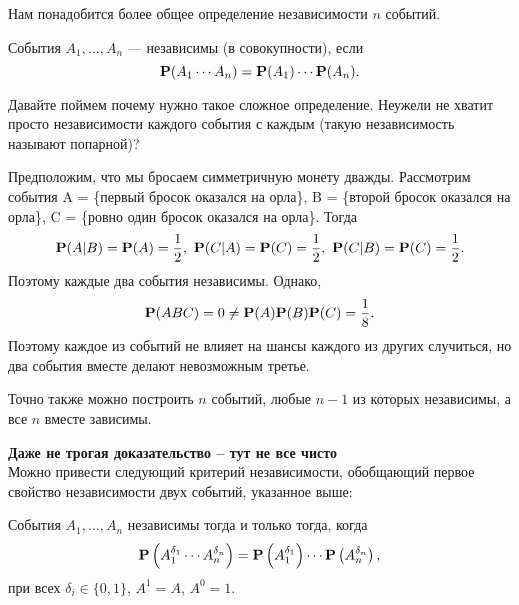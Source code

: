 \documentclass[11 pt,russian]{article}
\begin{document}
Нам понадобится более общее определение независимости $n$ событий.
\begin{Def}
События $A_1,\dotsc,A_n$ --- независимы (в совокупности), если
$${\bf P}(A_1 \dotsm A_n) = {\bf P}(A_1) \dotsm {\bf P}(A_n).
$$
\end{Def}
Давайте поймем почему нужно такое сложное определение. Неужели не хватит просто независимости каждого события с каждым (такую независимость называют попарной)?
\begin{Exam}
Предположим, что мы бросаем симметричную монету дважды. Рассмотрим события A = \{первый бросок оказался на орла\}, B = \{второй бросок оказался на орла\}, C = \{ровно один бросок оказался на орла\}. Тогда 
$$
{\bf P}(A|B) = {\bf P}(A) = \frac12,\ 
{\bf P}(C|A) = {\bf P}(C) = \frac12,\
{\bf P}(C|B) = {\bf P}(C) = \frac12.
$$
Поэтому каждые два события независимы. Однако,
$$
{\bf P}(ABC) = 0 \neq {\bf P}(A) {\bf P}(B) {\bf P}(C) = \frac18.
$$
Поэтому каждое из событий не влияет на шансы каждого из других случиться, но два события вместе делают невозможным третье.

Точно также можно построить $n$ событий, любые $n-1$ из которых независимы, а все $n$ вместе зависимы.
\end{Exam}
{\bf Даже не трогая доказательство -- тут не все чисто\\ }
Можно привести следующий критерий независимости, обобщающий первое свойство независимости двух событий, указанное выше:
\begin{Lemm}
\label{LemmDelt}
События $A_1,\dotsc,A_n$ независимы тогда и только тогда, когда 
\begin{equation}
\label{L2-Th2}
{\bf P}\left(A_1^{\delta_1} \dotsm A_n^{\delta_n}\right) = {\bf P}\left(A_1^{\delta_1}\right) \dotsm {\bf P}\left(A_n^{\delta_n}\right),
\end{equation}
при всех $\delta_i\in \{0,1\}$, $A^{1}=A$, $A^0=1$.
\end{Lemm}
\end{document}
